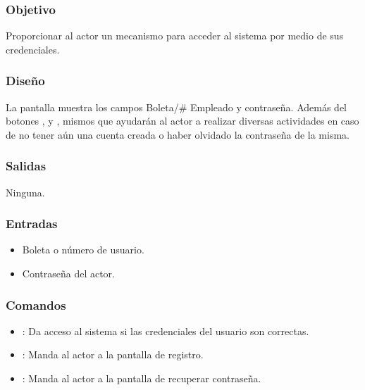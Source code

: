 \subsubsection{Objetivo}
	\noindent
	Proporcionar al actor un mecanismo para acceder al sistema por medio de sus credenciales. 

\subsubsection{Diseño}
	\noindent
	La pantalla muestra los campos Boleta/\# Empleado y contraseña.
	\noindent
	Además del botones ,  y , mismos que ayudarán al actor a realizar diversas actividades en caso de no tener aún una cuenta creada o haber olvidado la contraseña de la misma. 

\pagebreak
{}

\subsubsection{Salidas}
	\noindent
	Ninguna.

\subsubsection{Entradas}
	
	\begin{itemize}
		\item Boleta o número de usuario.
		\item Contraseña del actor.
	\end{itemize}

\subsubsection{Comandos}
	
	\begin{itemize}
		\item {}: Da acceso al sistema si las credenciales del usuario son correctas.
		\item {}: Manda al actor a la pantalla de registro.
		\item {}: Manda al actor a la pantalla de recuperar contraseña.
	\end{itemize}

